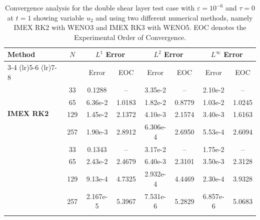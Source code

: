 \documentclass[final,11pt]{siamart251216}
\numberwithin{equation}{section}
\theoremstyle{definition}
\theoremstyle{remark}
\begin{document}
\begin{table}[htbp]
    \centering
    \small
    \begin{tabular}{@{} l c cc cc cc @{}}
        \toprule
        \multirow{2}{*}{\textbf{Method}} & \multirow{2}{*}{$N$} & \multicolumn{2}{c}{\textbf{$L^1$ Error}} & \multicolumn{2}{c}{\textbf{$L^2$ Error}} & \multicolumn{2}{c}{\textbf{$L^\infty$ Error}} \\
        \cmidrule(lr){3-4} \cmidrule(lr){5-6} \cmidrule(lr){7-8}
        & & Error & EOC & Error & EOC & Error & EOC \\
        \midrule
        \multirow{4}{*}{\textbf{IMEX RK2}} 
        & 33  & 0.1288 & --   & 3.35e-2 & --   & 2.10e-2 & --   \\
       & 65  & 6.36e-2 & 1.0183 & 1.82e-2 & 0.8779 & 1.03e-2 & 1.0245 \\
       & 129  & 1.45e-2 & 2.1372 & 4.10e-3 & 2.1574 & 3.40e-3 & 1.6163 \\
        & 257  & 1.90e-3 & 2.8912 & 6.306e-4 & 2.6950 & 5.53e-4 & 2.6094 \\
        
        \addlinespace[0.3cm]
        \multirow{4}{*}{\textbf{IMEX RK3}} 
        & 33  & 0.1343 & --   & 3.17e-2 & --   & 1.75e-2 & --   \\
        & 65  & 2.43e-2 & 2.4679 & 6.40e-3 & 2.3101 & 3.50e-3 & 2.3128 \\
        & 129  & 9.13e-4 & 4.7325 & 2.932e-4 & 4.4469 & 2.30e-4 & 3.9328 \\
        & 257  & 2.167e-5 & 5.3967 & 7.531e-6 & 5.2829 & 6.857e-6 & 5.0683 \\
 \\
        
        
        \bottomrule
    \end{tabular}
    \caption{Convergence analysis for the double shear layer test case with $\varepsilon = 10^{-6}$ and $\tau = 0$ at $t = 1$ showing variable $u_2$ and using two different numerical methods, namely IMEX RK2 with WENO3 and IMEX RK3 with WENO5. EOC denotes the Experimental Order of Convergence.}
        \label{tab:convergence_u2}
\end{table}
\end{document}
